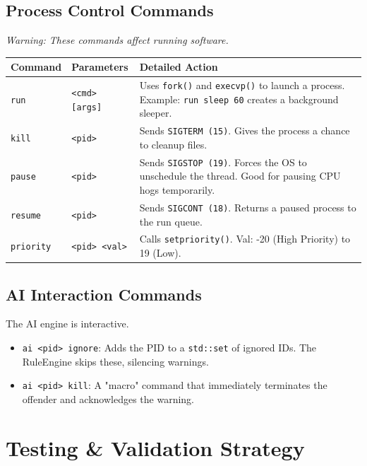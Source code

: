 \documentclass[a4paper,12pt]{article}
\begin{document}
\subsection{Process Control Commands}
\textit{Warning: These commands affect running software.}

\begin{longtable}{|p{3cm}|p{4cm}|p{7cm}|}
\hline
\textbf{Command} & \textbf{Parameters} & \textbf{Detailed Action} \\ \hline
\texttt{run} & \texttt{<cmd> [args]} & Uses \texttt{fork()} and \texttt{execvp()} to launch a process. \newline Example: \texttt{run sleep 60} creates a background sleeper. \\ \hline
\texttt{kill} & \texttt{<pid>} & Sends \texttt{SIGTERM (15)}. Gives the process a chance to cleanup files. \\ \hline
\texttt{pause} & \texttt{<pid>} & Sends \texttt{SIGSTOP (19)}. Forces the OS to unschedule the thread. Good for pausing CPU hogs temporarily. \\ \hline
\texttt{resume} & \texttt{<pid>} & Sends \texttt{SIGCONT (18)}. Returns a paused process to the run queue. \\ \hline
\texttt{priority} & \texttt{<pid> <val>} & Calls \texttt{setpriority()}. \newline Val: -20 (High Priority) to 19 (Low). \\ \hline
\end{longtable}

\subsection{AI Interaction Commands}
The AI engine is interactive.
\begin{itemize}
    \item \texttt{ai <pid> ignore}: Adds the PID to a \texttt{std::set} of ignored IDs. The RuleEngine skips these, silencing warnings.
    \item \texttt{ai <pid> kill}: A "macro" command that immediately terminates the offender and acknowledges the warning.
\end{itemize}

\newpage

\section{Testing & Validation Strategy}
\end{document}
